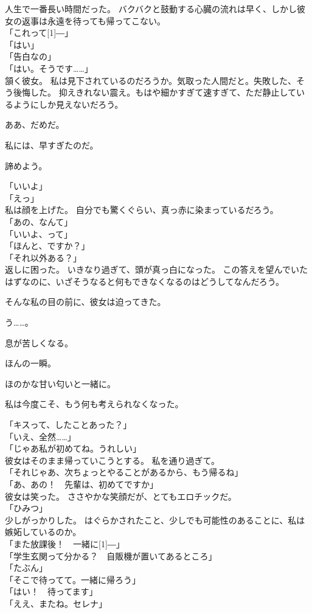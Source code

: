 \documentclass[../IHMain]{subfiles}
\begin{document}
人生で一番長い時間だった。
バクバクと鼓動する心臓の流れは早く、しかし彼女の返事は永遠を待っても帰ってこない。\\
「これって\scalebox{3}[1]{―}」\\
「はい」\\
「告白なの」\\
「はい。そうです……」\\
頷く彼女。
私は見下されているのだろうか。気取った人間だと。失敗した、そう後悔した。
抑えきれない震え。もはや細かすぎて速すぎて、ただ静止しているようにしか見えないだろう。

ああ、だめだ。

私には、早すぎたのだ。

諦めよう。

「いいよ」\\
「えっ」\\
私は顔を上げた。
自分でも驚くぐらい、真っ赤に染まっているだろう。\\
「あの、なんて」\\
「いいよ、って」\\
「ほんと、ですか？」\\
「それ以外ある？」\\
返しに困った。
いきなり過ぎて、頭が真っ白になった。
この答えを望んでいたはずなのに、いざそうなると何もできなくなるのはどうしてなんだろう。

そんな私の目の前に、彼女は迫ってきた。

う……。

息が苦しくなる。

ほんの一瞬。

ほのかな甘い匂いと一緒に。

私は今度こそ、もう何も考えられなくなった。

「キスって、したことあった？」\\
「いえ、全然……」\\
「じゃあ私が初めてね。うれしい」\\
彼女はそのまま帰っていこうとする。
私を通り過ぎて。\\
「それじゃあ、次ちょっとやることがあるから、もう帰るね」\\
「あ、あの！　先輩は、初めてですか」\\
彼女は笑った。
ささやかな笑顔だが、とてもエロチックだ。\\
「ひみつ」\\
少しがっかりした。
はぐらかされたこと、少しでも可能性のあることに、私は嫉妬しているのか。\\
「また放課後！　一緒に\scalebox{3}[1]{―}」\\
「学生玄関って分かる？　自販機が置いてあるところ」\\
「たぶん」\\
「そこで待ってて。一緒に帰ろう」\\
「はい！　待ってます」\\
「ええ、またね。セレナ」\\
\end{document}
